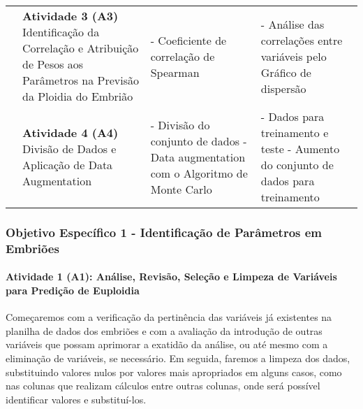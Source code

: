 \begin{table}[h!]
{\begin{tabular}{|p{3cm}|p{4cm}|p{3cm}|p{5cm}|}
      \cline{2-4}

      \cellcolor[HTML]{133e78} & 
      \textcolor[HTML]{133E78}{\textbf{Atividade 3 (A3)}} \newline
      Identificação da Correlação e Atribuição de Pesos aos Parâmetros na Previsão da Ploidia do Embrião &
      - Coeficiente de correlação de Spearman &
      - Análise das correlações entre variáveis pelo Gráfico de dispersão \\

      \cline{2-4}

      \cellcolor[HTML]{133e78} & 
      \vspace{0.2cm} \textcolor[HTML]{133E78}{\textbf{Atividade 4 (A4)}} \newline
      Divisão de Dados e Aplicação de Data Augmentation \vspace{0.2cm} & 
      - Divisão do conjunto de dados \newline
      - Data augmentation com o Algoritmo de Monte Carlo &
      - Dados para treinamento e teste \newline
      - Aumento do conjunto de dados para treinamento \\

      \hline
    \end{tabular}
  }
\end{table} 
\FloatBarrier  %

\subsubsection{\textbf{Objetivo Específico 1} - Identificação de Parâmetros em Embriões}

\paragraph{\textbf{Atividade 1 (A1):} Análise, Revisão, Seleção e Limpeza de Variáveis para Predição de Euploidia}

Começaremos com a verificação da pertinência das variáveis já existentes na planilha de dados dos embriões e com a avaliação da introdução de outras variáveis que possam aprimorar a exatidão da análise, ou até mesmo com a eliminação de variáveis, se necessário. Em seguida, faremos a limpeza dos dados, substituindo valores nulos por valores mais apropriados em alguns casos, como nas colunas que realizam cálculos entre outras colunas, onde será possível identificar valores e substituí-los.

